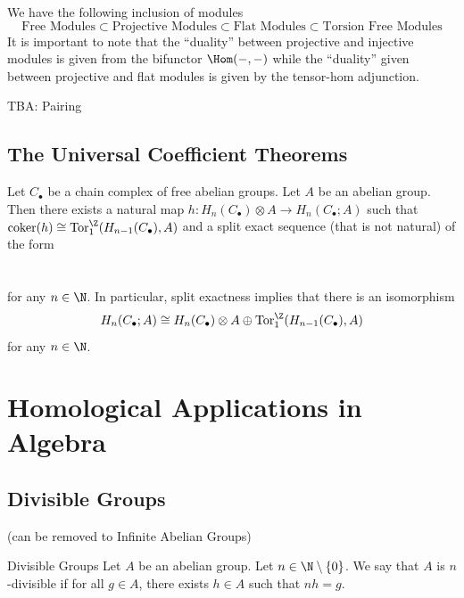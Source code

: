 \documentclass[a4paper]{article}
\begin{document}
We have the following inclusion of modules $$\text{Free Modules}\subset\text{Projective Modules}\subset\text{Flat Modules}\subset\text{Torsion Free Modules}$$ It is important to note that the ``duality'' between projective and injective modules is given from the bifunctor $\Hom(-,-)$ while the ``duality'' given between projective and flat modules is given by the tensor-hom adjunction. 

TBA: Pairing

\subsection{The Universal Coefficient Theorems}
\begin{prp}{}{} Let $C_\bullet$ be a chain complex of free abelian groups. Let $A$ be an abelian group. Then there exists a natural map $h:H_n(C_\bullet)\otimes A\to H_n(C_\bullet;A)$ such that $\text{coker}(h)\cong\text{Tor}_1^\Z(H_{n-1}(C_\bullet),A)$ and a split exact sequence (that is not natural) of the form \\~\\
\\
for any $n\in\N$. In particular, split exactness implies that there is an isomorphism $$H_n(C_\bullet;A)\cong H_n(C_\bullet)\otimes A\oplus\text{Tor}_1^\Z(H_{n-1}(C_\bullet),A)$$ for any $n\in\N$. 
\end{prp}

\pagebreak
\section{Homological Applications in Algebra}
\subsection{Divisible Groups}
(can be removed to Infinite Abelian Groups)

\begin{defn}{Divisible Groups}{} Let $A$ be an abelian group. Let $n\in\N\setminus\{0\}$. We say that $A$ is $n$-divisible if for all $g\in A$, there exists $h\in A$ such that $nh=g$. 
\end{defn}
\end{document}

